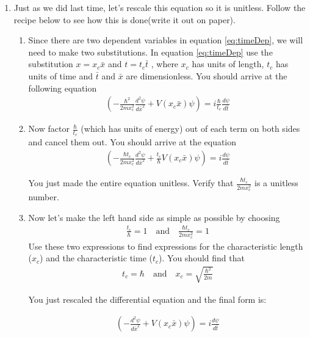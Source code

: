 \begin{flushright}
\begin{enumerate}
\item
\prob Just as we did last time, let's rescale this
equation so it is unitless. Follow the recipe below to see how this is
done(write it out on paper).
\flushleft
\begin{enumerate}
\item Since there are two dependent variables in equation
  \eqref{eq:timeDep}, we will need to make two substitutions.  In
  equation \eqref{eq:timeDep} use the substitution $x = x_c\bar{x}$
  and $t = t_c \bar{t}$ , where $x_c$ has units of length, $t_c$ has
  units of time and $\bar{t}$ and $\bar{x}$ are dimensionless.  You
  should arrive at the following equation
\begin{align}
 \left( -\frac{\hbar^2}{2 m x_c^2} \frac{d^2\psi}{d\bar{x}^2} +
   V(x_c\bar{x}) \psi \right) = i \frac{\hbar}{t_c}\frac{d\psi}{d \bar{t}}
\end{align}
\item Now factor $\frac{\hbar}{t_c}$ (which has units of energy) out
  of each term on both sides and cancel them out.  You should arrive
  at the equation
\begin{align}
 \left( -\frac{\hbar t_c}{2 m x_c^2} \frac{d^2\psi}{d\bar{x}^2} +
   \frac{t_c}{\hbar}V(x_c\bar{x}) \psi \right) = i \frac{d\psi}{d \bar{t}}
\end{align}

You just made the entire equation unitless.  Verify that $\frac{\hbar
  t_c}{2 m x_c^2}$ is a unitless number.

\item Now let's make the left hand side as simple as possible by choosing
\begin{align}
  \frac{t_c}{\hbar} = 1 \quad\mathrm{and} \quad  \frac{\hbar t_c}{2 m x_c^2} = 1
  \label{equ:rescale}
\end{align}
Use these two expressions to find expressions for the characteristic
length ($x_c$) and the characteristic time ($t_c$).  You should find that
\begin{align}
  t_c = \hbar \quad\mathrm{and} \quad x_c = \sqrt{\frac{\hbar^2}{2 m }}
\end{align}

You just rescaled the differential equation and the final form is:

\begin{align}
 \left( - \frac{d^2\psi}{d\bar{x}^2} +
   V(x_c\bar{x}) \psi \right) = i \frac{d\psi}{d \bar{t}}
\end{align}
\end{enumerate}
\end{enumerate}
\end{flushright}
\vspace{0.25in}

